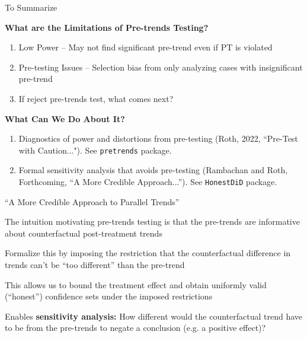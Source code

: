 \documentclass[aspectratio = 169, 13pt]{beamer}
\begin{document}
\begin{frame}{To Summarize}
	
	\textbf{What are the Limitations of Pre-trends Testing?}
	\begin{enumerate}
		\item
		      Low Power -- May not find significant pre-trend even if PT is violated
		          
		\item
		      Pre-testing Issues -- Selection bias from only analyzing cases with insignificant pre-trend
		          
		\item
		      If reject pre-trends test, what comes next? 
	\end{enumerate}
	
	\bigskip
	\pause 
	
	\textbf{What Can We Do About It?}
	\begin{enumerate}
		\item 
		      Diagnostics of power and distortions from pre-testing (Roth, 2022, ``Pre-Test with Caution..."). See \texttt{pretrends} package. \hyperlink{power_analysis}{}
		          
		\item
		      Formal sensitivity analysis that avoids pre-testing (Rambachan and Roth, Forthcoming, ``A More Credible Approach...''). See \texttt{HonestDiD} package.
		          
	\end{enumerate}
	
\end{frame}




\begin{frame}{``A More Credible Approach to Parallel Trends''}
	\begin{wideitemize}
		
		
		\item The intuition motivating pre-trends testing is that the pre-trends are informative about counterfactual post-treatment trends
		
		\item Formalize this by imposing the restriction that the counterfactual difference in trends can't be ``too different'' than the pre-trend
		
		
		\item This allows us to bound the treatment effect and obtain uniformly valid (``honest'') confidence sets under the imposed restrictions
		
		
		\item Enables \textbf{sensitivity analysis:} How different would the counterfactual trend have to be from the pre-trends to negate a conclusion (e.g. a positive effect)?
		
	\end{wideitemize}
	
\end{frame}
\end{document}
